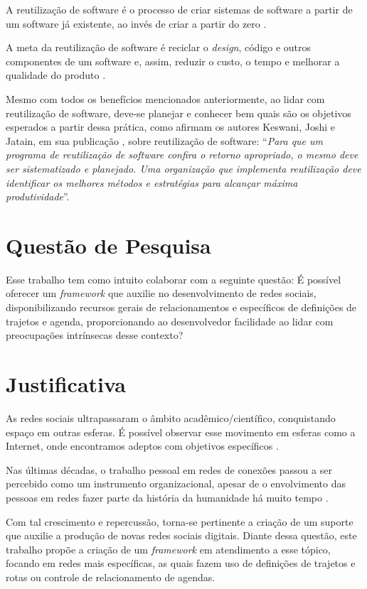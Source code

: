 A reutilização de software é o processo de criar sistemas de software a partir de um software já existente, ao invés de criar a partir do zero \cite{Krueger:1992}.

A meta da reutilização de software é reciclar o \textit{design}, código e outros componentes de um software e, assim, reduzir o custo, o tempo e melhorar a qualidade do produto \cite{Keswani:Joshi:Jatain:2014}.

Mesmo com todos os benefícios mencionados anteriormente, ao lidar com reutilização de software, deve-se planejar e conhecer bem quais são os objetivos esperados a partir dessa prática, como afirmam os autores Keswani, Joshi e Jatain, em sua publicação  \cite{Keswani:Joshi:Jatain:2014}, sobre reutilização de software: ``\textit{Para que um programa de reutilização de software confira o retorno apropriado, o mesmo deve ser sistematizado e planejado. Uma organização que implementa reutilização deve identificar os melhores métodos e estratégias para alcançar máxima produtividade}''.

\section{Questão de Pesquisa}

Esse trabalho tem como intuito colaborar com a seguinte questão: É possível oferecer um \textit{framework} que auxilie no desenvolvimento de redes sociais, disponibilizando recursos gerais de relacionamentos e específicos de definições de trajetos e agenda, proporcionando ao desenvolvedor facilidade ao lidar com preocupações intrínsecas desse contexto?

\section{Justificativa}

As redes sociais ultrapassaram o âmbito acadêmico/científico, conquistando espaço em outras esferas. É possível observar esse movimento em esferas como a Internet, onde encontramos adeptos com objetivos específicos \cite{Tomae:Alcara:Chiara:2005}.

Nas últimas décadas, o trabalho pessoal em redes de conexões passou a ser percebido como um instrumento organizacional, apesar de o envolvimento das pessoas em redes fazer parte da história da humanidade há muito tempo \cite{Tomae:Alcara:Chiara:2005}.

Com tal crescimento e repercussão, torna-se pertinente a criação de um suporte que auxilie a produção de novas redes sociais digitais. Diante dessa questão, este trabalho propõe a criação de um \textit{framework} em atendimento a esse tópico, focando em redes mais específicas, as quais fazem uso de definições de trajetos e rotas ou controle de relacionamento de agendas.

